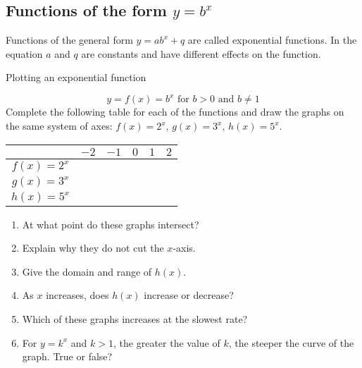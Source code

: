 \subsection*{Functions of the form $y=b^{x}$}        
Functions of the general form $y=ab^{x}+q$ are called exponential functions. In the equation $a$ and $q$ are constants and have different effects on the function.
\par
{}
\begin{wex}{Plotting an exponential function}
{
\begin{equation*}
  y=f(x)=b^{x} \mbox{ for } b>0 \mbox{ and } b \neq 1
\end{equation*}
Complete the following table for each of the functions and draw the graphs on the same system of axes:
$f(x)=2^{x}$, $g(x)=3^{x}$, $h(x)=5^{x}$.
\begin{table}[H]
\begin{center}
\begin{tabular}{|c|c|c|c|c|c|}
\hline
   &  $-2$ & $-1$ & $0$ & $1$ & $2$ 
\\ \hline
 $f(x)=2^{x}$& \hspace{1cm}   & \hspace{1cm} & \hspace{1cm} & \hspace{1cm} & \hspace{1cm} 
\\ \hline
 $g(x)=3^{x}$&  &&&&
\\ \hline
 $h(x)=5^{x}$&  &&&&
\\ \hline
\end{tabular}
\end{center}
\end{table}
\begin{minipage}{0.8\textwidth}
\begin{enumerate}[noitemsep, label=\textbf{\arabic*}. ] 
 \item At what point do these graphs intersect?
\item Explain why they do not cut the $x$-axis.
\item Give the domain and range of $h(x)$.
 \item As $x$ increases, does $h(x)$ increase or decrease?
\item Which of these graphs increases at the slowest rate?
\item For $y=k^{x}$ and $k>1$, the greater the value of $k$, the steeper the curve of the graph. True or false?
\end{enumerate}

\end{minipage}}
\end{wex}
